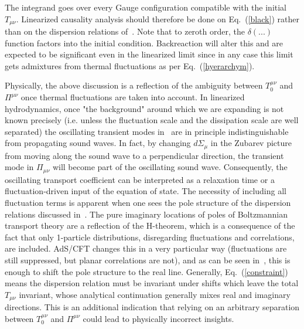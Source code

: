 \documentclass[12pt,onecolumn,showpacs,amssymb,aps,nofootinbib,floatfix]{revtex4-2}
\renewcommand{\eqref}[1]{Eq.~(\ref{#1})}
\begin{document}
	The integrand goes over every Gauge configuration compatible with the initial $T_{\mu \nu}$. Linearized causality analysis should therefore be done on \eqref{black} rather than on the dispersion relations of~\cite{spal}.  Note that to zeroth order, the $\delta(...)$ function factors into the initial condition. Backreaction will alter this and are expected to be significant even in the linearized limit since in any case this limit gets admixtures from thermal fluctuations as per \eqref{hyerarchym}.
	
	
	Physically, the above discussion is a reflection of the ambiguity between $T_0^{\mu \nu}$ and $\Pi^{\mu \nu}$ once thermal fluctuations are taken into account. In linearized hydrodynamics, once "the background" around which we are expanding is not known precisely (i.e. unless the fluctuation scale and the dissipation scale are well separated) the oscillating transient modes in~\cite{janik} are in principle indistinguishable from propagating sound waves. In fact, by changing $d \Sigma_\mu$ in the Zubarev picture from moving along the sound wave to a perpendicular direction, the transient mode in $\Pi_{\mu \nu}$ will become part of the oscillating sound wave.
	Consequently, the oscillating transport coefficient can be interpreted as a relaxation time or a fluctuation-driven input of the equation of state. The necessity of including all fluctuation terms is apparent when one sees the pole structure of the dispersion relations discussed in~\cite{janik}.  The pure imaginary locations of poles of Boltzmannian transport theory are a reflection of the H-theorem, which is a consequence of the fact that only 1-particle distributions, disregarding fluctuations and correlations, are included.  AdS/CFT changes this in a very particular way (fluctuations are still suppressed, but planar correlations are not), and as can be seen in~\cite{janik}, this is enough to shift the pole structure to the real line.  Generally, \eqref{constraint} means the dispersion relation must be invariant under shifts which leave the total $T_{\mu \nu}$ invariant, whose analytical continuation generally mixes real and imaginary directions. This is an additional indication that relying on an arbitrary separation between $T_0^{\mu \nu}$ and $\Pi^{\mu \nu}$ could lead to physically incorrect insights.
	
\end{document}
